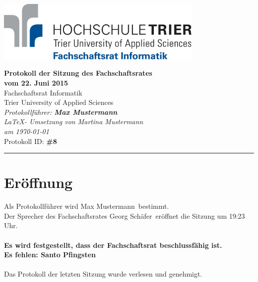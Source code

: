 \documentclass[a4paper, 11pt]{article} %
\newcounter{summe}
\newcommand{\abstimmung}[4]{
	\setcounter{summe}{#3}
	\addtocounter{summe}{#4}
	\begin{flushleft}
		#1\\
	Es wird über den Antrag abgestimmt.
	\end{flushleft}
	\ifthenelse{\equal{#3}{0}\AND\equal{#4}{0}}{
	\begin{center}
		\textbf{Der Antrag wird einstimmig angenommen.}
	\end{center}
	}{
	\begin{center}
		#2 \ifthenelse{\equal{#2}{1}}{Stimme}{Stimmen} dafür, #3 \ifthenelse{\equal{#3}{1}}{Stimme}{Stimmen} dagegen, #4 \ifthenelse{\equal{#42}{1}}{Enthaltung}{Enthaltungen}\\
		\ifthenelse{#2>\value{summe}}{
		\textbf{Der Antrag ist somit angenommen.}
		}{
		\textbf{Der Antrag ist somit abgelehnt.}
		}
	\end{center}
	}  
}
\newcommand{\protokoller}{Max Mustermann}
\newcommand{\dateOfMeeting}{22. Juni 2015}
\newcommand{\TeXer}{Martina Mustermann}
\newcommand{\fsiPresident}{Georg Schäfer}
\newcommand{\protocolID}{8}
\begin{document}

\doublespacing
\thispagestyle{empty}

\begin{center}
\includegraphics[width=10.0cm]{../logo_fsi.eps}

\vspace*{\fill}
{\LARGE \textbf{Protokoll der Sitzung des Fachschaftsrates \\vom \dateOfMeeting}}\\
Fachschaftsrat Informatik\\
Trier University of Applied Sciences\\
\vspace{2.5cm}
\textit{
	Protokollführer: \textbf{\protokoller} \\
	\LaTeX - Umsetzung von \TeXer\\
	am \today\\
}
Protokoll ID: \textbf{\#\protocolID}
\vfill
\end{center}

\hspace*{-35cm}
\textcolor{fsi}{\rule{64.9cm}{15pt}}
\pagebreak
 
\setcounter{tocdepth}{2}
\tableofcontents 
\pagebreak

\section{Eröffnung}
Als Protokollführer wird \protokoller~bestimmt.\\
Der Sprecher des Fachschaftsrates \fsiPresident~eröffnet die Sitzung um 19:23 Uhr.
\\\\
\textbf{Es wird festgestellt, dass der Fachschaftsrat beschlussfähig ist.}\\
\textbf{Es fehlen: Santo Pfingsten}
\\\\
Das Protokoll der letzten Sitzung wurde verlesen und genehmigt.

\end{document}

